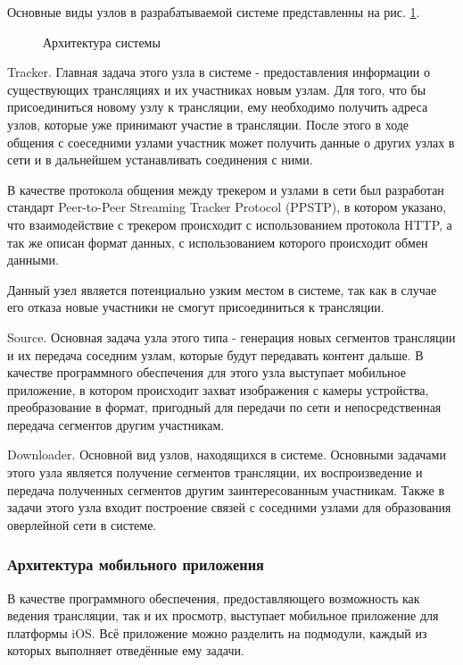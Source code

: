 			Основные виды узлов в разрабатываемой системе представленны на рис. \ref{img:system-architecture}.

			\begin{figure}[h]
				\caption{Архитектура системы}
				\label{img:system-architecture}
			\end{figure}

			Tracker. Главная задача этого узла в системе - предоставления информации о существующих трансляциях
			и их участниках новым узлам. Для того, что бы присоединиться новому узлу к трансляции, ему необходимо
			получить адреса узлов, которые уже принимают участие в трансляции. После этого в ходе общения с соеседними
			узлами участник может получить данные о других узлах в сети и в дальнейшем устанавливать соединения с ними.

			В качестве протокола общения между трекером и узлами в сети был разработан стандарт Peer-to-Peer Streaming
			Tracker Protocol (PPSTP), в котором указано, что взаимодействие с трекером происходит с использованием
			протокола HTTP, а так же описан формат данных, с использованием которого происходит обмен данными.

			Данный узел является потенциально узким местом в системе, так как в случае его отказа новые участники не
			смогут присоединиться к трансляции.

			Source. Основная задача узла этого типа - генерация новых сегментов трансляции и их передача
			соседним узлам, которые будут передавать контент дальше. В качестве программного обеспечения для этого
			узла выступает мобильное приложение, в котором происходит захват изображения с камеры устройства,
			преобразование в формат, пригодный для передачи по сети и непосредственная передача сегментов другим
			участникам.

			Downloader. Основной вид узлов, находящихся в системе. Основными задачами этого узла является
			получение сегментов трансляции, их воспроизведение и передача полученных сегментов другим заинтересованным
			участникам. Также в задачи этого узла входит построение связей с соседними узлами для образования оверлейной
			сети в системе.

		\subsubsection{Архитектура мобильного приложения}
			В качестве программного обеспечения, предоставляющего возможность как ведения трансляции, так и их просмотр,
			выступает мобильное приложение для платформы iOS. Всё приложение можно разделить на подмодули, каждый из
			которых выполняет отведённые ему задачи.

